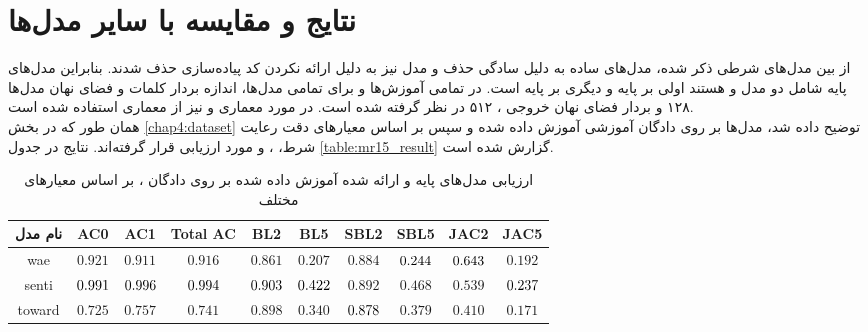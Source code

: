 \section{نتایج و مقایسه با سایر مدل‌ها}
از بین مدل‌های شرطی ذکر شده، مدل‌های ساده به دلیل سادگی حذف و مدل  نیز به دلیل ارائه نکردن کد پیاده‌سازی حذف شدند. بنابراین مدل‌های پایه شامل دو مدل \towardctg{} و \sentigan{} هستند اولی بر پایه \vae{} و دیگری بر پایه \gan{} است. در تمامی آموزش‌ها و برای تمامی مدل‌ها، اندازه بردار \embedding{} کلمات و فضای نهان مدل‌ها ۱۲۸ و بردار فضای نهان خروجی \encoder{}، ۵۱۲ در نظر گرفته شده است. در مورد معماری \encoder{} و \decoder{} نیز از معماری \transformer{} استفاده شده است.
\\
همان طور که در بخش \ref{chap4:dataset} توضیح داده شد، مدل‌ها بر روی دادگان آموزشی  آموزش داده شده و سپس بر اساس معیارهای  دقت رعایت شرط، \bleu{} ، \selfbleu{} و \jaccard{} مورد ارزیابی قرار گرفته‌اند. نتایج در جدول \ref{table:mr15_result} گزارش شده است.

\begin{table}[!htb]
	\centering
	\caption{
		ارزیابی مدل‌های پایه و ارائه شده آموزش داده شده بر روی دادگان ، بر اساس معیار‌های مختلف}
	\label{table:amazon_result}
	\small\tabcolsep=0.07cm
	\begin{tabular}{||c||c c c|c c|c c|c c||}\hline\hline نام مدل & AC0                        & AC1                        & Total AC                   & BL2                        & BL5                        & SBL2                       & SBL5                       & JAC2                       & JAC5                       \\
		\hline\hline
		wae                                            & $0.921$                    & $0.911$                    & $0.916$                    & $0.861$                    & $0.207$                    & $0.884$                    & $\cellcolor{gray!25}0.244$ & $\cellcolor{gray!25}0.643$ & $0.192$                    \\
		\hline
		senti                                          & $\cellcolor{gray!25}0.991$ & $\cellcolor{gray!25}0.996$ & $\cellcolor{gray!25}0.994$ & $\cellcolor{gray!25}0.903$ & $\cellcolor{gray!25}0.422$ & $0.892$                    & $0.468$                    & $0.539$                    & $\cellcolor{gray!25}0.237$ \\
		\hline
		toward                                         & $0.725$                    & $0.757$                    & $0.741$                    & $0.898$                    & $0.340$                    & $\cellcolor{gray!25}0.878$ & $0.379$                    & $0.410$                    & $0.171$                    \\
		\hline
		\hline\end{tabular}\normalsize
\end{table}

